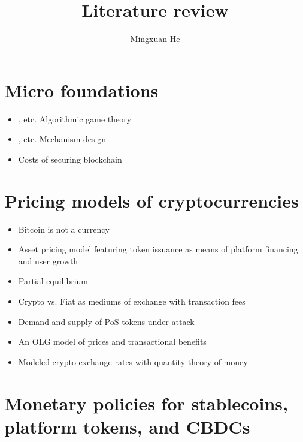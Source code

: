 \documentclass[12pt, a4paper]{article}
\title{Literature review}
\author{Mingxuan He}
\begin{document}
\maketitle


\section*{Micro foundations}

\begin{itemize}
    \item \cite{nisan2007algorithmic}, etc. Algorithmic game theory
    \item \cite{gans2022mechanism}, etc. Mechanism design
    \item \cite{budish2018economic, gans2019more} Costs of securing blockchain
\end{itemize}

\section*{Pricing models of cryptocurrencies}
\begin{itemize}
    \item \cite{yermack2015bitcoin} Bitcoin is not a currency
    \item \cite{cong2021tokenomics, cong2022token} Asset pricing model featuring token issuance as means of platform financing and user growth
    \item \cite{athey2016bitcoin, catalini2020some} Partial equilibrium
    \item \cite{schilling2019some, schilling2019currency} Crypto vs. Fiat as mediums of exchange with transaction fees
    \item \cite{catalini2020markets} Demand and supply of PoS tokens under attack
    \item \cite{biais2020equilibrium} An OLG model of prices and transactional benefits
    \item \cite{bolt2020value} Modeled crypto exchange rates with quantity theory of money
\end{itemize}

\section*{Monetary policies for stablecoins, platform tokens, and CBDCs}
\end{document}
